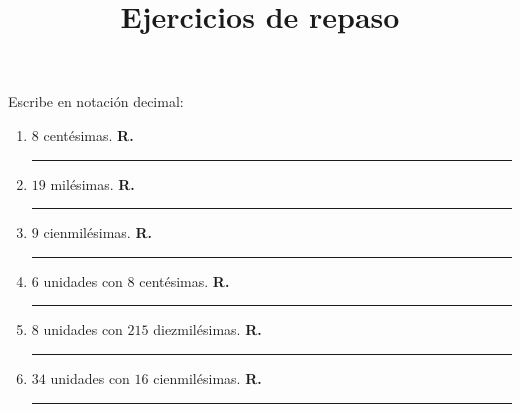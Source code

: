 

\title{Ejercicios de repaso \vspace{-2cm}}
\author{}
\date{ }

\renewcommand\thechoice{\Alph{choice})}
\newcommand\choicelabel{\thechoice}

\newenvironment{choices}%
  {\list{\choicelabel}%
     {\usecounter{choice}\def\makelabel##1{\hss\llap{##1}}%
       \settowidth{\leftmargin}{W.\hskip\labelsep\hskip 2.5em}%
       \def\choice{%
         \item
       } %
       \labelwidth\leftmargin\advance\labelwidth-\labelsep
       \topsep=0pt
       \partopsep=0pt
     }%
  }%
  {\endlist}

\newenvironment{oneparchoices}%
  {%
    \setcounter{choice}{0}%
    \def\choice{%
      \refstepcounter{choice}%
      \ifnum\value{choice}>1\relax
        \penalty -50\hskip 1em plus 1em\relax
      \fi
      \choicelabel
      \nobreak\enskip
    }%
    \ifvmode\else\enskip\fi
    \ignorespaces
  }%
  {}


\maketitle
\fontsize{14}{14}\selectfont

Escribe en notación decimal:
\begin{enumerate}[label=\alph*)]
\item $8$ centésimas. \hspace{0.3cm} \textbf{R.} \rule{3cm}{0.1mm}
\item $19$ milésimas. \hspace{0.3cm} \textbf{R.} \rule{3cm}{0.1mm}
\item $9$ cienmilésimas. \hspace{0.3cm} \textbf{R.} \rule{3cm}{0.1mm}
\item $6$ unidades con $8$ centésimas. \hspace{0.3cm} \textbf{R.} \rule{3cm}{0.1mm}
\item $8$ unidades con $215$ diezmilésimas. \hspace{0.3cm} \textbf{R.} \rule{3cm}{0.1mm}
\item $34$ unidades con $16$ cienmilésimas. \hspace{0.3cm} \textbf{R.} \rule{3cm}{0.1mm}
\end{enumerate}

